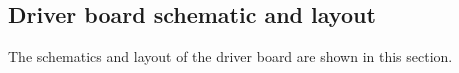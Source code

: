 \newpage
\begin{hugepage}
\subsection{Driver board schematic and layout}
The schematics and layout of the driver board are shown in this section.\\

\pdfpagewidth
\begin{figure}
\centering


\end{figure}
\end{hugepage}
\newpage